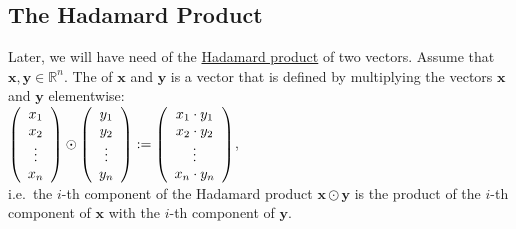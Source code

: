 \subsection{The Hadamard Product}
Later, we will have need of the \href{https://en.wikipedia.org/wiki/Hadamard_product_(matrices)}{Hadamard product} 
of two vectors.  Assume that $\mathbf{x}, \mathbf{y} \in \mathbb{R}^n$.  The  of
$\mathbf{x}$ and $\mathbf{y}$ is a vector that is defined by multiplying the vectors $\mathbf{x}$ and $\mathbf{y}$ elementwise:
\\[0.2cm]
\hspace*{1.3cm}
$\left(
  \begin{array}[c]{c}
    x_1 \\
    x_2 \\
    \vdots \\
    x_n
  \end{array}
\right) \odot
\left(
  \begin{array}[c]{c}
    y_1 \\
    y_2 \\
    \vdots \\
    y_n
  \end{array}
\right) := 
\left(
  \begin{array}[c]{c}
    x_1 \cdot y_1 \\
    x_2 \cdot y_2 \\
    \vdots \\
    x_n \cdot y_n
  \end{array}
\right)
$,
\\[0.2cm]
i.e.~the $i$-th component of the Hadamard product $\mathbf{x} \odot \mathbf{y}$ is the product of the $i$-th
component of $\mathbf{x}$ with the $i$-th component of $\mathbf{y}$.

